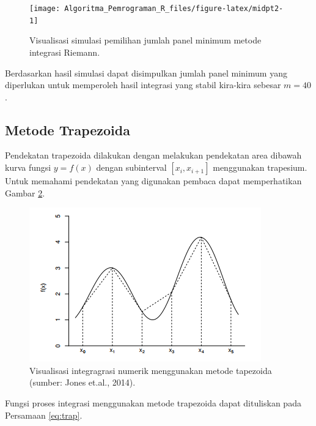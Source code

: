 \documentclass[
]{book}
\theoremstyle{definition}
\theoremstyle{definition}
\theoremstyle{definition}
\theoremstyle{definition}
\theoremstyle{remark}
\begin{document}
\begin{figure}

{\centering \texttt{[image: Algoritma\_Pemrograman\_R\_files/figure-latex/midpt2-1]} 

}

\caption{Visualisasi simulasi pemilihan jumlah panel minimum metode integrasi Riemann.}\label{fig:midpt2}
\end{figure}

Berdasarkan hasil simulasi dapat disimpulkan jumlah panel minimum yang diperlukan untuk memperoleh hasil integrasi yang stabil kira-kira sebesar \(m=40\).

\hypertarget{trapezoida}{%
\subsection{Metode Trapezoida}\label{trapezoida}}

Pendekatan trapezoida dilakukan dengan melakukan pendekatan area dibawah kurva fungsi \(y=f\left(x\right)\) dengan subinterval \(\left[x_i,x_{i+1}\right]\) menggunakan trapesium. Untuk memahami pendekatan yang digunakan pembaca dapat memperhatikan Gambar \ref{fig:trapviz}.

\begin{figure}

{\centering \includegraphics[width=0.9\linewidth]{./images/trapviz} 

}

\caption{Visualisasi integragrasi numerik menggunakan metode tapezoida (sumber: Jones et.al., 2014).}\label{fig:trapviz}
\end{figure}

Fungsi proses integrasi menggunakan metode trapezoida dapat dituliskan pada Persamaan \eqref{eq:trap}.
\end{document}
